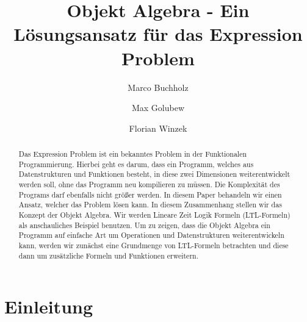\documentclass{llncs}
\begin{document}
%
\frontmatter          %
%
\pagestyle{headings}  %
%
\mainmatter              %
%
\title{Objekt Algebra - Ein Lösungsansatz für das Expression Problem}
%
%
\author{Marco Buchholz%
\and
Max Golubew%
\and
Florian Winzek%
}
%
%
%

\maketitle              %

\begin{abstract}
Das Expression Problem ist ein bekanntes Problem in der Funktionalen Programmierung. Hierbei geht es darum, dass ein Programm, welches aus Datenstrukturen und Funktionen besteht, in diese zwei Dimensionen weiterentwickelt werden soll, ohne das Programm neu kompilieren zu müssen. Die Komplexität des Programs darf ebenfalls nicht größer werden. In diesem Paper behandeln wir einen Ansatz, welcher das Problem lösen kann. In diesem Zusammenhang stellen wir das Konzept der Objekt Algebra. Wir werden Lineare Zeit Logik Formeln (LTL-Formeln) als anschauliches Beispiel benutzen. Um zu zeigen, dass die Objekt Algebra ein Programm auf einfache Art um Operationen und Datenstrukturen weiterentwickeln kann, werden wir zunächst eine Grundmenge von LTL-Formeln betrachten und diese dann um zusätzliche Formeln und Funktionen erweitern.

\end{abstract}
%
\section{Einleitung} \label{sec:introduction}
\end{document}
